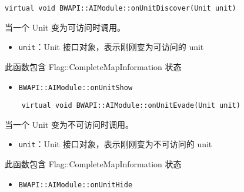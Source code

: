 \begin{tcolorbox}[colback=white, colframe=black!60!white, title=onUnitDiscover(), arc=0mm]
\begin{verbatim}
virtual void BWAPI::AIModule::onUnitDiscover(Unit unit)
\end{verbatim}
当一个 Unit 变为可访问时调用。
\begin{parameter}
    \begin{itemize}
        \item \texttt{unit}：Unit 接口对象，表示刚刚变为可访问的 unit
    \end{itemize}
\end{parameter}
\begin{note}
    此函数包含 Flag::CompleteMapInformation 状态
\end{note}
\begin{refer}
    \begin{itemize}
        \item \texttt{BWAPI::AIModule::onUnitShow}
    \end{itemize}
\end{refer}
\end{tcolorbox}

\begin{tcolorbox}[colback=white, colframe=black!60!white, title=onUnitEvade(), arc=0mm]
    \begin{verbatim}
    virtual void BWAPI::AIModule::onUnitEvade(Unit unit)
    \end{verbatim}
    当一个 Unit 变为不可访问时调用。
    \begin{parameter}
        \begin{itemize}
            \item \texttt{unit}：Unit 接口对象，表示刚刚变为不可访问的 unit
        \end{itemize}
    \end{parameter}
    \begin{note}
        此函数包含 Flag::CompleteMapInformation 状态
    \end{note}
    \begin{refer}
        \begin{itemize}
            \item \texttt{BWAPI::AIModule::onUnitHide}
        \end{itemize}
    \end{refer}
\end{tcolorbox}
    
